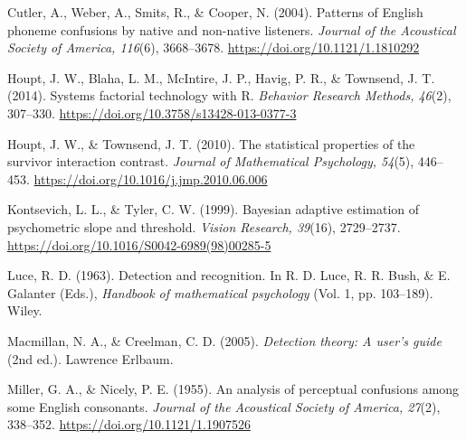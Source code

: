 \documentclass[man,12pt,floatsintext,natbib]{apa7}
\begin{document}
\begin{thebibliography}{}

Cutler, A., Weber, A., Smits, R., \& Cooper, N. (2004). Patterns of English phoneme confusions by native and non-native listeners. \emph{Journal of the Acoustical Society of America, 116}(6), 3668--3678. \url{https://doi.org/10.1121/1.1810292}

Houpt, J. W., Blaha, L. M., McIntire, J. P., Havig, P. R., \& Townsend, J. T. (2014). Systems factorial technology with R. \emph{Behavior Research Methods, 46}(2), 307--330. \url{https://doi.org/10.3758/s13428-013-0377-3}

Houpt, J. W., \& Townsend, J. T. (2010). The statistical properties of the survivor interaction contrast. \emph{Journal of Mathematical Psychology, 54}(5), 446--453. \url{https://doi.org/10.1016/j.jmp.2010.06.006}

Kontsevich, L. L., \& Tyler, C. W. (1999). Bayesian adaptive estimation of psychometric slope and threshold. \emph{Vision Research, 39}(16), 2729--2737. \url{https://doi.org/10.1016/S0042-6989(98)00285-5}

Luce, R. D. (1963). Detection and recognition. In R. D. Luce, R. R. Bush, \& E. Galanter (Eds.), \emph{Handbook of mathematical psychology} (Vol. 1, pp. 103--189). Wiley.

Macmillan, N. A., \& Creelman, C. D. (2005). \emph{Detection theory: A user's guide} (2nd ed.). Lawrence Erlbaum.

Miller, G. A., \& Nicely, P. E. (1955). An analysis of perceptual confusions among some English consonants. \emph{Journal of the Acoustical Society of America, 27}(2), 338--352. \url{https://doi.org/10.1121/1.1907526}

\end{thebibliography}
\end{document}
